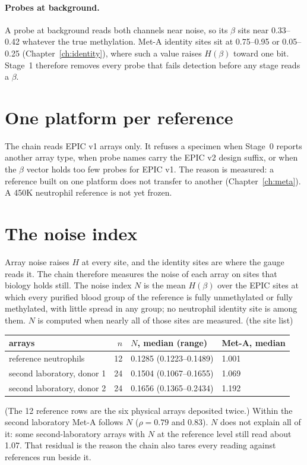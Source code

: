 \paragraph{Probes at background.} A probe at background reads both channels near noise, so its $\beta$ sits near 0.33--0.42 whatever the
true methylation. \measured{} Met-A identity sites sit at 0.75--0.95 or 0.05--0.25
(Chapter~\ref{ch:identity}), where such a value raises $H(\beta)$ toward one bit. Stage~1 therefore removes every probe that fails detection before any stage reads a $\beta$.

\section{One platform per reference}

The chain reads EPIC v1 arrays only. It refuses a specimen when Stage~0 reports another array type, when probe names carry the EPIC v2
design suffix, or when the $\beta$ vector holds too few probes for EPIC v1. The reason is
measured: a reference built on one platform does not transfer to another (Chapter~\ref{ch:meta}). A 450K neutrophil reference is not
yet frozen. \openprob

\section{The noise index}

Array noise raises $H$ at every site, and the identity sites are where the gauge reads it. The chain therefore measures the noise of each
array on sites that biology holds still. The noise index $N$ is the mean $H(\beta)$ over the EPIC sites at which every purified blood
group of the reference is fully unmethylated or fully methylated, with little spread in any group; no
neutrophil identity site is among them. $N$ is computed when nearly all of those sites are measured. \calibrated{} (the site list)

\begin{center}\small
\begin{tabular}{@{}lrll@{}}\toprule
arrays & $n$ & $N$, median (range) & Met-A, median \\\midrule
reference neutrophils & 12 & 0.1285 (0.1223--0.1489) & 1.001 \\
second laboratory, donor 1 & 24 & 0.1504 (0.1067--0.1655) & 1.069 \\
second laboratory, donor 2 & 24 & 0.1656 (0.1365--0.2434) & 1.192 \\\bottomrule
\end{tabular}
\end{center}
\measured{} (The 12 reference rows are the six physical arrays deposited twice.) Within the second laboratory
Met-A follows $N$ ($\rho=0.79$ and 0.83). $N$ does not explain all of it: some second-laboratory arrays with $N$ at the reference level still read
about 1.07. That residual is the reason the chain also tares every reading against references run beside it.

